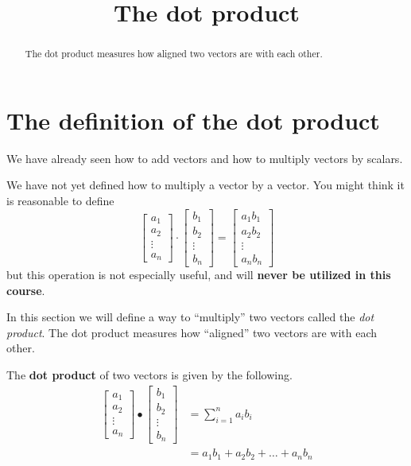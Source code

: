 \documentclass{ximera}
\title[Dig-In:]{The dot product}
\begin{document}
\begin{abstract}
  The dot product measures how aligned two vectors are with each
  other.
\end{abstract}
\maketitle


\section{The definition of the dot product}

We have already seen how to add vectors and how to multiply vectors by
scalars.

\begin{warning}
We have not yet defined how to multiply a vector by a vector.  You
might think it is reasonable to define
\[
\begin{bmatrix}
  a_1\\
  a_2\\
  \vdots\\
  a_n
\end{bmatrix}
\cdot
\begin{bmatrix}
  b_1\\
  b_2\\
  \vdots\\
  b_n
\end{bmatrix}
=
\begin{bmatrix}
  a_1b_1\\
  a_2b_2\\
  \vdots\\
  a_nb_n
\end{bmatrix}
\] 
but this operation is not especially useful, and will \textbf{never be
  utilized in this course}.
\end{warning}

In this section we will define a way to ``multiply'' two vectors
called the \textit{dot product}. The dot product measures how
``aligned'' two vectors are with each other.

\begin{definition}
  The \textbf{dot product} of two vectors is given by the following.
  \begin{align*}
  \begin{bmatrix}
    a_1\\
    a_2\\
    \vdots\\
    a_n
  \end{bmatrix}
  \bullet
  \begin{bmatrix}
    b_1\\
    b_2\\
    \vdots\\
    b_n
  \end{bmatrix}
  &= \sum_{i=1}^n a_ib_i\\
  &= a_1b_1 + a_2b_2 +\dots+a_nb_n
  \end{align*}
\end{definition}
\end{document}
